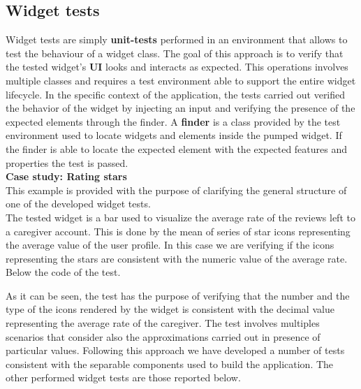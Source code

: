 \documentclass[../../dd.tex]{subfiles}
\begin{document}
	\subsection{Widget tests}
	Widget tests are simply \textbf{unit-tests} performed in an environment that allows to test the behaviour of a widget class. The goal of this approach is to verify that the tested  widget’s \textbf{UI} looks and interacts as expected. This operations involves multiple classes and requires a test environment able to support the entire widget lifecycle. In the specific context of the application, the tests carried out verified the behavior of the widget by injecting an input and verifying the presence of the expected elements through the finder. A \textbf{finder} is a class provided by the test environment used to locate widgets and elements inside the pumped widget. If the finder is able to locate the expected element with the expected features and properties the test is passed.\\

	\textbf{Case study: Rating stars}\\
	This example is provided with the purpose of clarifying the general structure of one of the developed widget tests. \\
	The tested widget is a bar used to visualize the average rate of the reviews left to a caregiver account. This is done by the mean of series of star icons representing the average value of the user profile. In this case we are verifying if the icons representing the stars are consistent with the numeric value of the average rate.  Below the code of the test.

    \vspace{2 mm}
    
    \vspace{8 mm}

	As it can be seen, the test has the purpose of verifying that the number and the type of the icons rendered by the widget is consistent with the decimal value representing the average rate of the caregiver. The test involves multiples scenarios that consider also the approximations carried out in presence of particular values.
	Following this approach we have developed a number of tests consistent with the separable components used to build the application. The other performed widget tests are those reported below.
\end{document}

